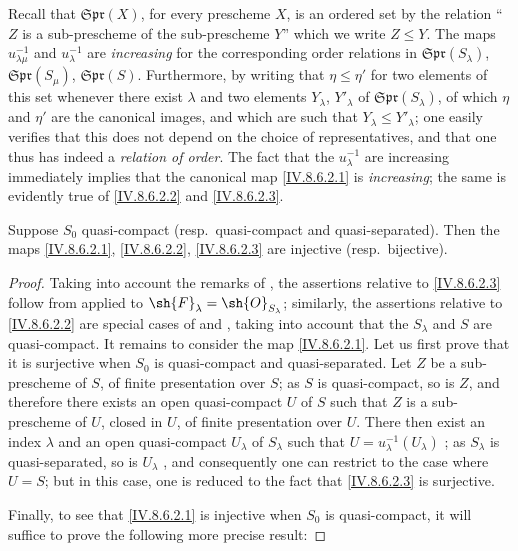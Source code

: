 
Recall  that $\mathfrak{Spr}(X)$, for every prescheme $X$, is an ordered set by the relation ``$Z$ is a sub-prescheme of the sub-prescheme $Y$'' which we write $Z\leqslant Y$.
The maps $u_{\lambda\mu}^{-1}$ and $u_\lambda^{-1}$ are \emph{increasing} for the corresponding order relations in $\mathfrak{Spr}(S_\lambda)$, $\mathfrak{Spr}(S_\mu)$, $\mathfrak{Spr}(S)$.
Furthermore, by writing that $\eta\leqslant\eta'$ for two elements of this set whenever there exist $\lambda$ and two elements $Y_\lambda$, $Y'_\lambda$ of $\mathfrak{Spr}(S_\lambda)$, of which $\eta$ and $\eta'$ are the canonical images, and which are such that $Y_\lambda\leqslant Y'_\lambda$; one easily verifies that this does not depend on the choice of representatives, and that one thus has indeed a \emph{relation of order}.
The fact that the $u_\lambda^{-1}$ are increasing immediately implies that the canonical map \eqref{IV.8.6.2.1} is \emph{increasing}; the same is evidently true of \eqref{IV.8.6.2.2} and \eqref{IV.8.6.2.3}.

\begin{proposition}[8.6.3]
\label{IV.8.6.3}
Suppose $S_0$ quasi-compact (resp.\ quasi-compact and quasi-separated).
Then the maps \eqref{IV.8.6.2.1}, \eqref{IV.8.6.2.2}, \eqref{IV.8.6.2.3} are injective (resp.\ bijective).
\end{proposition}

\begin{proof}
Taking into account the remarks of , the assertions relative to \eqref{IV.8.6.2.3} follow from  applied to $\sh{F}_\lambda=\sh{O}_{S_\lambda}$; similarly, the assertions relative to \eqref{IV.8.6.2.2} are special cases of  and , taking into account that the $S_\lambda$ and $S$ are quasi-compact.
It remains to consider the map \eqref{IV.8.6.2.1}.
Let us first prove that it is surjective when $S_0$ is quasi-compact and quasi-separated.
Let $Z$ be a sub-prescheme of $S$, of finite presentation over $S$; as $S$ is quasi-compact, so is $Z$, and therefore there exists an open quasi-compact $U$ of $S$ such that $Z$ is a sub-prescheme of $U$, closed in $U$, of finite presentation over $U$.
There then exist an index $\lambda$ and an open quasi-compact $U_\lambda$ of $S_\lambda$ such that $U=u_\lambda^{-1}(U_\lambda)$ ; as $S_\lambda$ is quasi-separated, so is $U_\lambda$ , and consequently one can restrict to the case where $U=S$; but in this case, one is reduced to the fact that \eqref{IV.8.6.2.3} is surjective.

Finally, to see that \eqref{IV.8.6.2.1} is injective when $S_0$ is quasi-compact, it will suffice to prove the following more precise result:
\end{proof}

